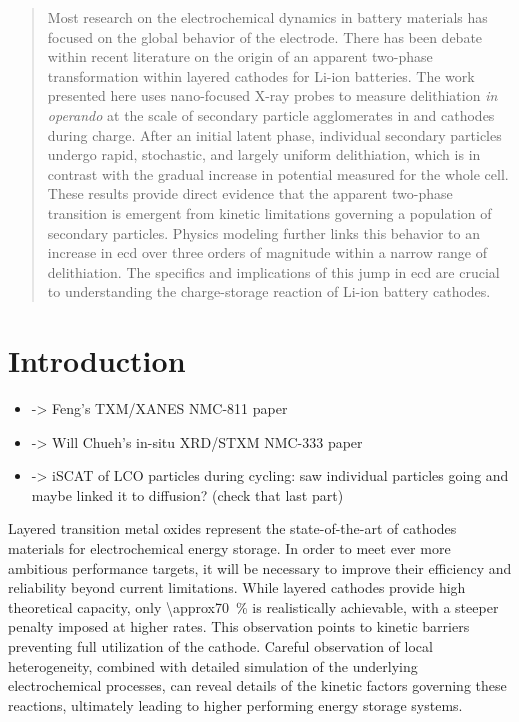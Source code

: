 \documentclass{article}
\begin{document}
\maketitle

\begin{abstract}
  Most research on the electrochemical dynamics in battery materials
  has focused on the global behavior of the electrode. There has been
  debate within recent literature on the origin of an apparent
  two-phase transformation within layered cathodes for Li-ion
  batteries. The work presented here uses nano-focused X-ray probes to
  measure delithiation \textit{in operando} at the scale of secondary
  particle agglomerates in \nca{} and \nmc{} cathodes during
  charge. After an initial latent phase, individual secondary
  particles undergo rapid, stochastic, and largely uniform
  delithiation, which is in contrast with the gradual increase in
  potential measured for the whole cell. These results provide direct
  evidence that the apparent two-phase transition is emergent from
  kinetic limitations governing a population of secondary
  particles. Physics modeling further links this behavior to an
  increase in \gls{ecd} over three orders of magnitude within a narrow
  range of delithiation. The specifics and implications of this jump
  in \gls{ecd} are crucial to understanding the charge-storage
  reaction of Li-ion battery cathodes.
\end{abstract}

\listoftodos

\section{Introduction}

\begin{itemize}
\item {} -> Feng's TXM/XANES NMC-811 paper
\item {} -> Will Chueh's in-situ XRD/STXM NMC-333 paper
\item {} -> iSCAT of LCO particles during cycling: saw
  individual particles going and maybe linked it to diffusion? (check
  that last part)
\end{itemize}

Layered transition metal oxides represent the state-of-the-art of
cathodes materials for electrochemical energy storage. In order to
meet ever more ambitious performance targets, it will be necessary to
improve their efficiency and reliability beyond current
limitations. While layered cathodes provide high theoretical capacity,
only \SI{\approx70}{\percent} is realistically achievable, with a
steeper penalty imposed at higher rates\citeme{}. This observation
points to kinetic barriers preventing full utilization of the
cathode. Careful observation of local heterogeneity, combined with
detailed simulation of the underlying electrochemical processes, can
reveal details of the kinetic factors governing these reactions,
ultimately leading to higher performing energy storage systems. 
\end{document}
